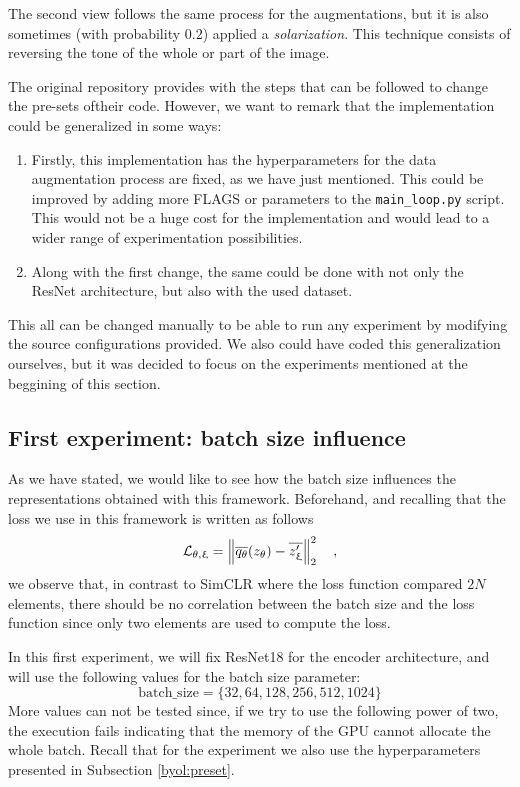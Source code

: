 The second view follows the same process for the augmentations, but it is also sometimes (with probability $0.2$) applied a \emph{solarization}. This technique consists of reversing the tone of the whole or part of the image.


The original repository provides with the steps that can be followed to change the pre-sets oftheir code. However, we want to remark that the implementation could be generalized in some ways:
\begin{enumerate}
\item Firstly, this implementation has the hyperparameters for the data augmentation process are fixed, as we have just mentioned. This could be improved by adding more FLAGS or parameters to the \lstinline{main_loop.py} script. This would not be a huge cost for the implementation and would lead to a wider range of experimentation possibilities.

\item Along with the first change, the same could be done with not only the ResNet architecture, but also with the used dataset.
\end{enumerate}

This all can be changed manually to be able to run any experiment by modifying the source configurations provided. We also could have coded this generalization ourselves, but it was decided to focus on the experiments mentioned at the beggining of this section.

\subsection{First experiment: batch size influence}
\label{experiments:byol:first}

As we have stated, we would like to see how the batch size influences the representations obtained with this framework.  Beforehand, and recalling that the loss we use in this framework is written as follows
\[
\mathcal L_{\theta,\upxi} = \left\lVert\overline{q_\theta}(z_\theta) - \overline{z_\upxi'}\right\rVert_2^2\quad , 
\]
we observe that, in contrast to SimCLR where the loss function compared $2N$ elements, there should be no correlation between the batch size and the loss function since only two elements are used to compute the loss. 

In this first experiment, we will fix ResNet18 for the encoder architecture, and will use the following values for the batch size parameter:
\[
\text{batch\_size} = \{32,64,128,256,512,1024\}    
\]
More values can not be tested since, if we try to use the following power of two, the execution fails indicating that the memory of the GPU cannot allocate the whole batch. Recall that for the experiment we also use the hyperparameters presented in Subsection \ref{byol:preset}.


